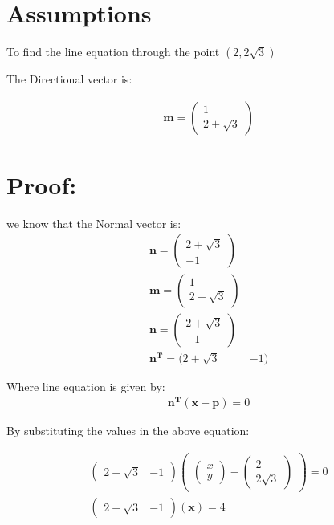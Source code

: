 \documentclass[journal,10pt,twocolumn]{article}
\let\vec\mathbf
\newcommand{\myvec}[1]{\ensuremath{\begin{pmatrix}#1\end{pmatrix}}}
\begin{document}
\section*{Assumptions}
To find the line equation  through the point $(2,2\sqrt{3})$
\vspace*{3mm}

 The Directional vector is:

\begin{align}
	\vec{m}=\myvec{1\\2+\sqrt{3}}
\end{align}
  
\section*{Proof:}
we know that the Normal vector is:
\begin{align}
	\vec{n}=\myvec{2+\sqrt{3}\\-1}\\
	\vec{m}=\myvec{1\\2+\sqrt{3}}\\
	\vec{n}=\myvec{2+\sqrt{3}\\-1}\\
	\vec{n^T}=(2+\sqrt{3}&-1)	
\end{align}






Where line equation  is given by:
\begin{align}
	\vec{n^T(x-p)}=0
\end{align}

By substituting the values in the above equation:



\begin{align}
	\myvec{2+\sqrt{3} &-1}\myvec{\myvec{x\\y}-\myvec{2\\2\sqrt{3}}}=0\\
	\myvec{2+\sqrt{3}&-1}\vec{(x)}=4
\end{align}
\end{document}
